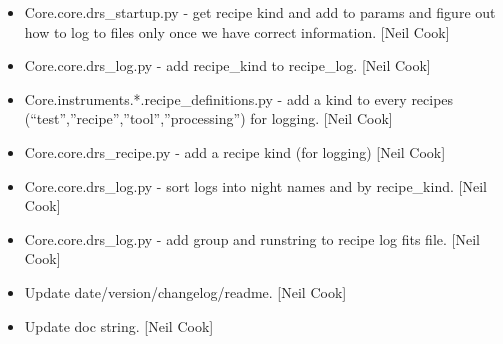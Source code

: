 \documentclass[a4paper,10pt,english]{report}
\begin{document}
\begin{itemize}
\item {} 
Core.core.drs\_startup.py - get recipe kind and add to params and
figure out how to log to files only once we have correct information.
{[}Neil Cook{]}

\item {} 
Core.core.drs\_log.py - add recipe\_kind to recipe\_log. {[}Neil Cook{]}

\item {} 
Core.instruments.*.recipe\_definitions.py - add a kind to every recipes
(“test”,”recipe”,”tool”,”processing”) for logging. {[}Neil Cook{]}

\item {} 
Core.core.drs\_recipe.py - add a recipe kind (for logging) {[}Neil Cook{]}

\item {} 
Core.core.drs\_log.py - sort logs into night names and by recipe\_kind.
{[}Neil Cook{]}

\item {} 
Core.core.drs\_log.py - add group and runstring to recipe log fits
file. {[}Neil Cook{]}

\item {} 
Update date/version/changelog/readme. {[}Neil Cook{]}

\item {} 
Update doc string. {[}Neil Cook{]}

\end{itemize}
\end{document}
